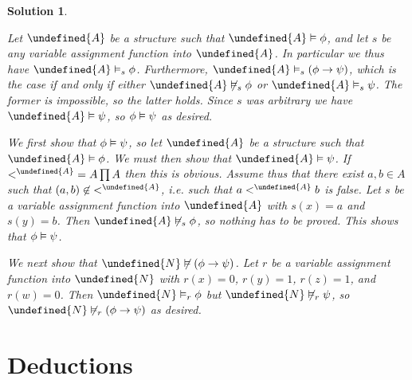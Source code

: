 \documentclass[article, a4paper, 11pt, oneside]{memoir}
\let\mathfrak\undefined
\numberwithin{equation}{chapter}
\newcommand{\frakN}{\mathfrak{N}}
\newcommand{\frakA}{\mathfrak{A}}
\theoremstyle{nonumberplain}
\newtheorem{solution}{Solution}
\begin{document}
\begin{solution}
\begin{solutionsec} %
    \item Let $\frakA$ be a structure such that $\frakA \models \phi$, and let $s$ be any variable assignment function into $\frakA$. In particular we thus have $\frakA \sats{s} \phi$. Furthermore, $\frakA \sats{s} (\phi \to \psi)$, which is the case if and only if either $\frakA \notsats{s} \phi$ or $\frakA \sats{s} \psi$. The former is impossible, so the latter holds. Since $s$ was arbitrary we have $\frakA \models \psi$, so $\phi \vDash \psi$ as desired.
    
    \item We first show that $\phi \vDash \psi$, so let $\frakA$ be a structure such that $\frakA \models \phi$. We must then show that $\frakA \models \psi$. If ${<^\frakA} = A \prod A$ then this is obvious. Assume thus that there exist $a,b \in A$ such that $(a,b) \not\in {<^\frakA}$, i.e. such that $a <^\frakA b$ is false. Let $s$ be a variable assignment function into $\frakA$ with $s(x) = a$ and $s(y) = b$. Then $\frakA \notsats{s} \phi$, so nothing has to be proved. This shows that $\phi \vDash \psi$.
    
    We next show that $\frakN \not\models (\phi \lcond \psi)$. Let $r$ be a variable assignment function into $\frakN$ with $r(x) = 0$, $r(y) = 1$, $r(z) = 1$, and $r(w) = 0$. Then $\frakN \sats{r} \phi$ but $\frakN \notsats{r} \psi$, so $\frakN \notsats{r} (\phi \lcond \psi)$ as desired.
\end{solutionsec}
\end{solution}


\chapter{Deductions}

\newcommand{\proves}{\vdash}
\newcommand{\thm}[1]{\mathrm{Thm}_{#1}}
\newcommand{\colonequiv}{\mathbin{\vcentcolon\equiv}}
\end{document}

